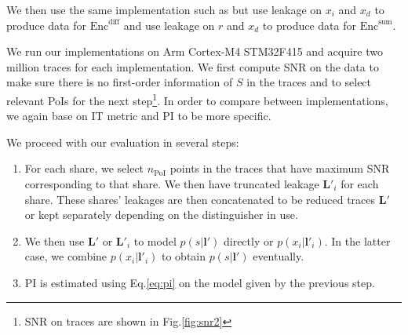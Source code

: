 \documentclass{llncs}
\begin{document}
	We then use the same implementation such as \cite{Kmaskimp0} but use leakage on $x_i$ and $x_d$ to produce data for $\text{Enc}^{\text{diff}}$ and use leakage on $r$ and $x_d$ to produce data for $\text{Enc}^{\text{sum}}$.
	
	We run our implementations on Arm Cortex-M4 STM32F415 and acquire two million traces for each implementation. We first compute SNR on the data to make sure there is no first-order information of $S$ in the traces and to select relevant PoIs for the next step\footnote{SNR on traces are shown in Fig.\ref{fig:snr2}}. In order to compare between implementations, we again base on IT metric and PI to be more specific.
	
	We proceed with our evaluation in several steps:
	\begin{enumerate}
		\item For each share, we select $n_{\text{PoI}}$ points in the traces that have maximum SNR corresponding to that share. We then have truncated leakage $\bm{L}'_i$ for each share. These shares' leakages are then concatenated to be reduced traces $\bm{L}'$ or kept separately depending on the distinguisher in use.
		\item We then use $\bm{L}'$ or $\bm{L}'_i$ to model $p(s|\bm{l}')$ directly or $p(x_i|\bm{l}'_i)$. In the latter case, we combine $p(x_i|\bm{l}'_i)$ to obtain $p(s|\bm{l}')$ eventually.
		\item PI is estimated using Eq.\ref{eq:pi} on the model given by the previous step.
	\end{enumerate}
	
\end{document}
